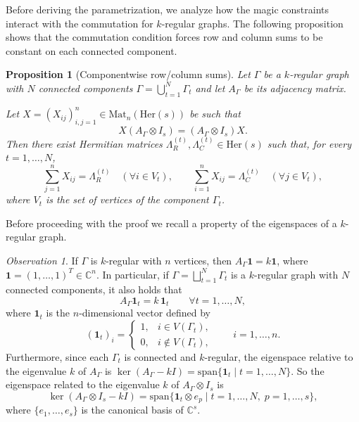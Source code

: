 \documentclass[11pt, a4paper]{article}
\theoremstyle{plain}
\newtheorem{proposition}[theorem]{Proposition}
\theoremstyle{definition}
\theoremstyle{remark}
\newtheorem{observation}[theorem]{Observation}
\newcommand{\C}{\mathbb{C}}
\begin{document}
Before deriving the parametrization, we analyze how the magic constraints interact with the commutation for \(k\)-regular graphs. The following proposition shows that the commutation condition forces row and column sums to be constant on each connected component.

\begin{proposition}[Componentwise row/column sums]\label{prop:regular_sums}
Let \(\Gamma\) be a \(k\)-regular graph with \(N\) connected components
\(\Gamma=\bigcup_{t=1}^N \Gamma_t\) and let \(A_\Gamma\) be its adjacency matrix.

Let \(X=\left(X_{ij}\right)_{i,j=1}^n\in \mathrm{Mat}_n(\mathrm{Her}(s))\) be such that
\[
X(A_\Gamma\otimes I_s)=(A_\Gamma\otimes I_s)X.
\]
Then there exist Hermitian matrices \(\Lambda_R^{(t)},\Lambda_C^{(t)}\in \mathrm{Her}(s)\) such that, for every \(t=1,\dots,N\),
\[
\sum_{j=1}^n X_{ij}=\Lambda_R^{(t)} \quad (\forall i\in V_t),
\qquad
\sum_{i=1}^n X_{ij}=\Lambda_C^{(t)} \quad (\forall j\in V_t),
\]
where \(V_t\) is the set of vertices of the component \(\Gamma_t\).
\end{proposition}
\bigskip
Before proceeding with the proof we recall a property of the eigenspaces of a \(k\)-regular graph.
\begin{observation}
If \(\Gamma\) is \(k\)-regular with \(n\) vertices, then \(A_{\Gamma}\mathbf 1 = k\mathbf 1\), where \(\mathbf 1=(1,\dots,1)^T \in \C^n\).
In particular, if \(\Gamma = \bigsqcup_{t=1}^N \Gamma_t\) is a \(k\)-regular graph with \(N\) connected components, it also holds that
\[
A_\Gamma \mathbf 1_t = k\,\mathbf 1_t \qquad \forall t=1,\dots,N,
\]
where \(\mathbf 1_t\) is the \(n\)-dimensional vector defined by
\[
(\mathbf 1_t)_i=
\begin{cases}
1, & i\in V(\Gamma_t),\\
0, & i\notin V(\Gamma_t),
\end{cases}
\qquad i=1,\dots,n.
\]
Furthermore, since each \(\Gamma_t\) is connected and \(k\)-regular, the eigenspace relative to the eigenvalue \(k\) of \(A_\Gamma\) is \(\ker(A_\Gamma-kI)=\mathrm{span}\{\mathbf 1_t \mid t=1,\dots,N\}\).
So the eigenspace related to the eigenvalue \(k\) of \(A_\Gamma\otimes I_s\) is
\[
\ker(A_\Gamma\otimes I_s-kI)
=
\mathrm{span}\{\mathbf 1_t \otimes e_p \mid t=1,\dots,N, \; p=1,\dots,s\},
\]
where $\{e_1, \dots, e_s\}$ is the canonical basis of $\mathbb{C}^s$.
\end{observation}
\end{document}
